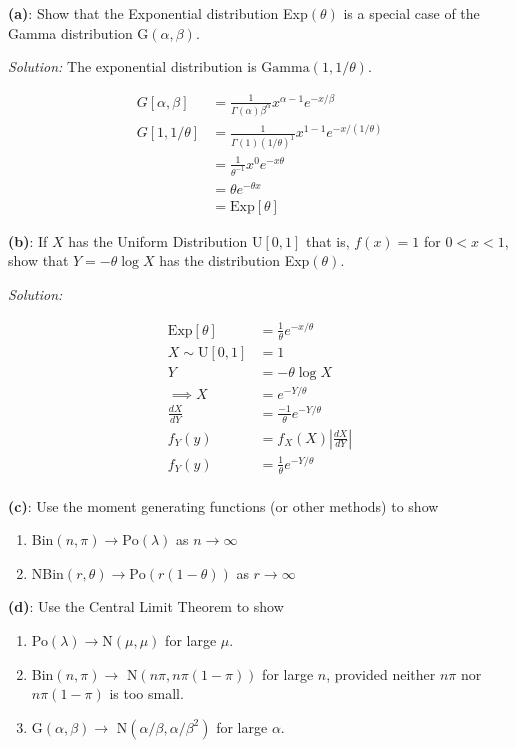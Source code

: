 \documentclass[]{article}
\providecommand{\tightlist}{%
  \setlength{\itemsep}{0pt}\setlength{\parskip}{0pt}}
\begin{document}
\textbf{(a)}: Show that the Exponential distribution Exp\((\theta)\) is
a special case of the Gamma distribution G\((\alpha, \beta)\).

\emph{Solution: } The exponential distribution is
\(\text{Gamma}(1, 1/\theta)\).

\begin{align*}
G[\alpha, \beta] &= \frac{1}{\Gamma(\alpha)\beta^\alpha}x^{\alpha-1}e^{-x/\beta}\\
G[1, 1/\theta] &= \frac{1}{\Gamma(1)(1/\theta)^1}x^{1-1}e^{-x/(1/\theta)}\\
                &= \frac{1}{\theta^{-1}}x^0e^{-x\theta}\\
                &= \theta e^{-\theta x}\\
                &= \text{Exp}[\theta]
\end{align*}

\textbf{(b)}: If \(X\) has the Uniform Distribution U\([0,1]\) that is,
\(f(x) = 1\) for \(0 < x < 1\), show that \(Y = -\theta \log X\) has the
distribution Exp\((\theta)\).

\emph{Solution: }

\begin{align*}
\text{Exp}[\theta] &= \frac{1}{\theta} e^{- x/\theta}\\
X \sim \text{U}[0,1] &= 1\\
Y &= -\theta \log X\\
\implies X &= e^{-Y/\theta}\\
\frac{dX}{dY} &= \frac{-1}{\theta}e^{-Y/\theta}\\
f_Y(y) &= f_X(X)\left|\frac{dX}{dY}\right|\\
f_Y(y) &= \frac{1}{\theta}e^{-Y/\theta}\\
\end{align*}

\textbf{(c)}: Use the moment generating functions (or other methods) to
show

\begin{enumerate}
\def\labelenumi{\roman{enumi}.}
\tightlist
\item
  Bin\((n, \pi) \rightarrow \text{Po}(\lambda)\) as
  \(n \rightarrow \infty\)
\item
  NBin\((r, \theta) \rightarrow \text{Po}(r(1 - \theta))\) as
  \(r \rightarrow \infty\)
\end{enumerate}

\textbf{(d)}: Use the Central Limit Theorem to show

\begin{enumerate}
\def\labelenumi{\roman{enumi}.}
\tightlist
\item
  Po\((\lambda) \rightarrow \text{N}(\mu, \mu)\) for large \(\mu\).
\item
  Bin\((n, \pi) \rightarrow\) N\((n\pi, n\pi(1 - \pi))\) for large
  \(n\), provided neither \(n\pi\) nor \(n\pi(1- \pi)\) is too small.
\item
  G\((\alpha, \beta) \rightarrow\) N\((\alpha/\beta, \alpha/\beta^2)\)
  for large \(\alpha\).
\end{enumerate}
\end{document}

